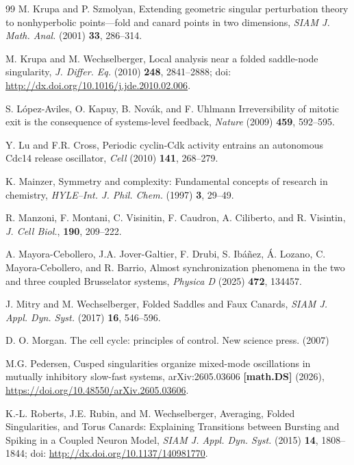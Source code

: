 \documentclass[10pt,onecolumn]{article}
\theoremstyle{plain}
\begin{document}
\begin{thebibliography}{99}
M. Krupa and P. Szmolyan,
Extending geometric singular perturbation theory to nonhyperbolic points---fold and canard points in two dimensions,
{\it SIAM J. Math. Anal.} (2001) {\bf 33}, 286--314.

M. Krupa and M. Wechselberger,
Local analysis near a folded saddle-node singularity,
{\it J. Differ. Eq.} (2010) {\bf 248}, 2841--2888;
doi: \href{http://dx.doi.org/10.1016/j.jde.2010.02.006}{http://dx.doi.org/10.1016/j.jde.2010.02.006}.

S. L\'{o}pez-Aviles, O. Kapuy, B. Nov\'{a}k, and F. Uhlmann
Irreversibility of mitotic exit is the consequence of systems-level feedback,
{\it Nature} (2009) {\bf 459}, 592--595.

Y. Lu and F.R. Cross,
Periodic cyclin-Cdk activity entrains an autonomous Cdc14 release oscillator,
{\it Cell} (2010)
{\bf 141}, 268--279.

K. Mainzer,
Symmetry and complexity: Fundamental concepts of research in chemistry,
{\it HYLE--Int. J. Phil. Chem.} (1997) {\bf 3}, 29--49.

R. Manzoni, F. Montani, C. Visinitin, F. Caudron, A. Ciliberto, and R. Visintin,
{\it J. Cell Biol.},
{\bf 190}, 209--222.

A. Mayora-Cebollero, J.A. Jover-Galtier, F. Drubi, S. Ib\'{a}\~{n}ez, \'{A}. Lozano, C. Mayora-Cebollero, and R. Barrio,
Almost synchronization phenomena in the two and three coupled Brusselator systems,
{\it Physica D} (2025) {\bf 472}, 134457.

J. Mitry and M. Wechselberger,
Folded Saddles and Faux Canards,
{\it SIAM J. Appl. Dyn. Syst.} (2017) {\bf 16}, 546--596.

D. O. Morgan. The cell cycle: principles of control. New science press. (2007)


M.G. Pedersen,
Cusped singularities organize mixed-mode oscillations in mutually inhibitory slow-fast systems,
arXiv:2605.03606 {\bf [math.DS]} (2026), \href{https://doi.org/10.48550/arXiv.2605.03606}{https://doi.org/10.48550/arXiv.2605.03606}.

K.-L. Roberts, J.E. Rubin, and M. Wechselberger,
Averaging, Folded Singularities, and Torus Canards: Explaining Transitions between Bursting and Spiking in a Coupled Neuron Model,
{\it SIAM J. Appl. Dyn. Syst.} (2015) {\bf 14}, 1808--1844;
doi: \href{http://dx.doi.org/10.1137/140981770}{http://dx.doi.org/10.1137/140981770}.


\end{thebibliography}
\end{document}
